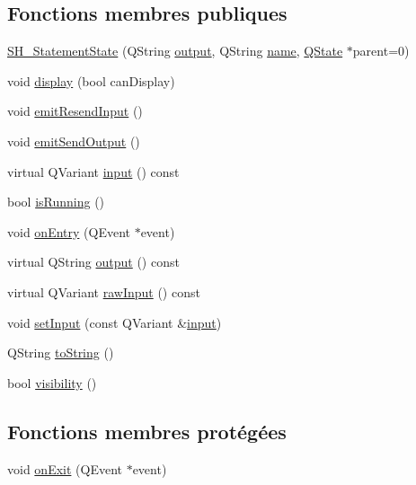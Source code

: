 \subsection*{Fonctions membres publiques}
\begin{DoxyCompactItemize}
\item 
\hyperlink{classSH__StatementState_acc888fc333049b693f05ff760e363f27}{S\-H\-\_\-\-Statement\-State} (Q\-String \hyperlink{classSH__InOutState_a17ed7eaf5e3ed5af80a4f9fe65d5bfd9}{output}, Q\-String \hyperlink{classSH__NamedObject_a9f686c6f2a5bcc08ad03d0cee0151f0f}{name}, \hyperlink{classQState}{Q\-State} $\ast$parent=0)
\item 
void \hyperlink{classSH__InOutState_a616f88b20478b81b2927a9ddc2b4f521}{display} (bool can\-Display)
\item 
void \hyperlink{classSH__InOutState_ad1695493d39c5194e5b7c6372754ddd7}{emit\-Resend\-Input} ()
\item 
void \hyperlink{classSH__InOutState_a40995f4a8201f21d26b7e78b7e7b652e}{emit\-Send\-Output} ()
\item 
virtual Q\-Variant \hyperlink{classSH__InOutState_a8e1b78069343122df7713624a1a5a100}{input} () const 
\item 
bool \hyperlink{classSH__GenericState_a5f731810dad0cacd28828ccbf1539e4e}{is\-Running} ()
\item 
void \hyperlink{classSH__StatementState_ab866a023213fe1bd1857705bf98a8f65}{on\-Entry} (Q\-Event $\ast$event)
\item 
virtual Q\-String \hyperlink{classSH__InOutState_a17ed7eaf5e3ed5af80a4f9fe65d5bfd9}{output} () const 
\item 
virtual Q\-Variant \hyperlink{classSH__InOutState_a4c674a54f41d2e6ef951b22393dcd89f}{raw\-Input} () const 
\item 
void \hyperlink{classSH__StatementState_ac9d6483521908224e4cb3765d680d113}{set\-Input} (const Q\-Variant \&\hyperlink{classSH__InOutState_a8e1b78069343122df7713624a1a5a100}{input})
\item 
Q\-String \hyperlink{classSH__GenericState_a7779babbb40f3f8faa71112204d9804f}{to\-String} ()
\item 
bool \hyperlink{classSH__InOutState_a3a18752c4122c26a2ebf38310c9c1b75}{visibility} ()
\end{DoxyCompactItemize}
\subsection*{Fonctions membres protégées}
\begin{DoxyCompactItemize}
\item 
void \hyperlink{classSH__GenericState_a7f7863859318c70c9b734be5bf5510b0}{on\-Exit} (Q\-Event $\ast$event)
\end{DoxyCompactItemize}


